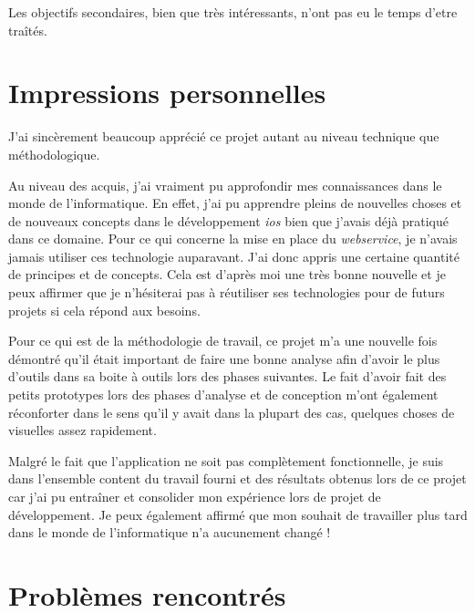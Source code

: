 \medskip

Les objectifs secondaires, bien que très intéressants, n'ont pas eu le temps d'etre traîtés.


\section{Impressions personnelles} %
\label{sec:impression_personnelle}
J'ai sincèrement beaucoup apprécié ce projet autant au niveau technique que méthodologique. 

\medskip

Au niveau des acquis, j'ai vraiment pu approfondir mes connaissances dans le monde de l'informatique. En effet, j'ai pu apprendre pleins de nouvelles choses et de nouveaux concepts dans le développement \emph{\gls{ios}} bien que j'avais déjà pratiqué dans ce domaine. Pour ce qui concerne la mise en place du \emph{\gls{webservice}}, je n'avais jamais utiliser ces technologie auparavant. J'ai donc appris une certaine quantité de principes et de concepts. Cela est d'après moi une très bonne nouvelle et je peux affirmer que je n'hésiterai pas à réutiliser ses technologies pour de futurs projets si cela répond aux besoins.

\medskip

Pour ce qui est de la méthodologie de travail, ce projet m'a une nouvelle fois démontré qu'il était important de faire une bonne analyse afin d'avoir le plus d'outils dans sa boite à outils lors des phases suivantes. Le fait d'avoir fait des petits prototypes lors des phases d'analyse et de conception m'ont également réconforter dans le sens qu'il y avait dans la plupart des cas, quelques choses de visuelles assez rapidement.

\medskip

Malgré le fait que l'application ne soit pas complètement fonctionnelle, je suis dans l'ensemble content du travail fourni et des résultats obtenus lors de ce projet car j'ai pu entraîner et consolider mon expérience lors de projet de développement. Je peux également affirmé que mon souhait de travailler plus tard dans le monde de l'informatique n'a aucunement changé !

\section{Problèmes rencontrés} %
\label{sec:probl_mes_rencontr_s}


